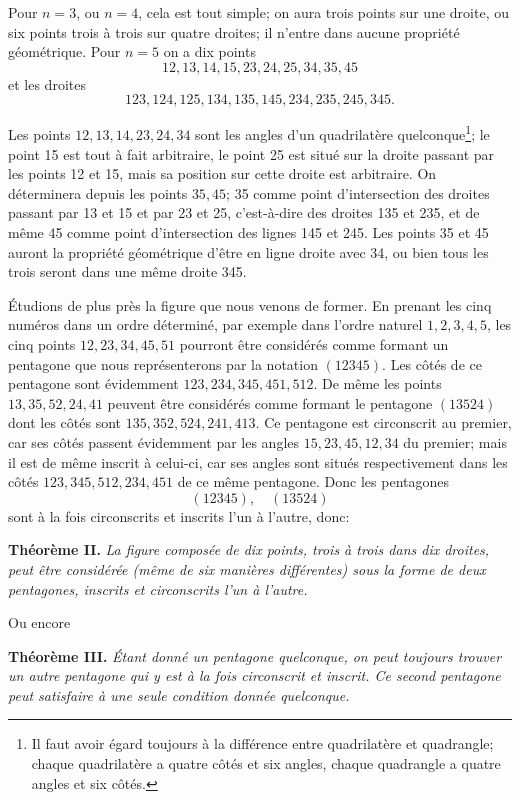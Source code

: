 \documentclass[12pt,a4paper]{article}
\begin{document}
Pour $n = 3$, ou $n = 4$, cela est tout simple; on aura trois points sur une droite, ou six points trois \`a trois sur quatre droites; il n'entre dans aucune propri\'et\'e g\'eom\'etrique. Pour $n = 5$ on a dix points
\[
12, 13, 14, 15, 23, 24, 25, 34, 35, 45
\]
et les droites
\[
123, 124, 125, 134, 135, 145, 234, 235, 245, 345.
\]

Les points $12, 13, 14, 23, 24, 34$ sont les angles d'un quadrilat\`ere quelconque\footnote{Il faut avoir \'egard toujours \`a la diff\'erence entre quadrilat\`ere et quadrangle; chaque quadrilat\`ere a quatre c\^ot\'es et six angles, chaque quadrangle a quatre angles et six c\^ot\'es.}; le point 15 est tout \`a fait arbitraire, le point 25 est situ\'e sur la droite passant par les points 12 et 15, mais sa position sur cette droite est arbitraire. On d\'eterminera depuis les points $35, 45$; 35 comme point d'intersection des droites passant par 13 et 15 et par 23 et 25, c'est-\`a-dire des droites 135 et 235, et de m\^eme 45 comme point d'intersection des lignes 145 et 245. Les points 35 et 45 auront la propri\'et\'e g\'eom\'etrique d'\^etre en ligne droite avec 34, ou bien tous les trois seront dans une m\^eme droite 345.

\'Etudions de plus pr\`es la figure que nous venons de former. En prenant les cinq num\'eros dans un ordre d\'etermin\'e, par exemple dans l'ordre naturel $1, 2, 3, 4, 5$, les cinq points $12, 23, 34, 45, 51$ pourront \^etre consid\'er\'es comme formant un pentagone que nous repr\'esenterons par la notation $(12345)$. Les c\^ot\'es de ce pentagone sont \'evidemment $123, 234, 345, 451, 512$. De m\^eme les points $13, 35, 52, 24, 41$ peuvent \^etre consid\'er\'es comme formant le pentagone $(13524)$ dont les c\^ot\'es sont $135, 352, 524, 241, 413$. Ce pentagone est circonscrit au premier, car ses c\^ot\'es passent \'evidemment par les angles $15, 23, 45, 12, 34$ du premier; mais il est de m\^eme inscrit \`a celui-ci, car ses angles sont situ\'es respectivement dans les c\^ot\'es $123, 345, 512, 234, 451$ de ce m\^eme pentagone. Donc les pentagones
\[
(12345),\quad (13524)
\]
sont \`a la fois circonscrits et inscrits l'un \`a l'autre, donc:

\textbf{Th\'eor\`eme II.} \emph{La figure compos\'ee de dix points, trois \`a trois dans dix droites, peut \^etre consid\'er\'ee (m\^eme de six mani\`eres diff\'erentes) sous la forme de deux pentagones, inscrits et circonscrits l'un \`a l'autre.}

Ou encore

\textbf{Th\'eor\`eme III.} \emph{\'Etant donn\'e un pentagone quelconque, on peut toujours trouver un autre pentagone qui y est \`a la fois circonscrit et inscrit. Ce second pentagone peut satisfaire \`a une seule condition donn\'ee quelconque.}
\end{document}
